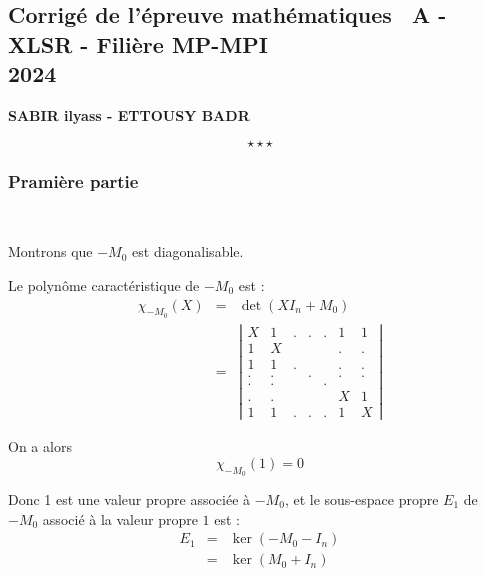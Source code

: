 \begin{center}
\subsection*{Corrig{\'e} de l'{\'e}preuve math{\'e}matiques \ A - \\ XLSR - Fili{\`e}re MP-MPI\\ 2024}\label{mathA_2023}
\textbf{SABIR ilyass - ETTOUSY BADR}
\end{center}
\[
\star \star \star
\]

\begin{center}
  \subsubsection*{Prami{\`e}re partie}
\end{center}

\

 Montrons que $- M_0$ est diagonalisable.

Le polyn{\^o}me caract{\'e}ristique de $- M_0$ est :
\begin{eqnarray*}
  \chi_{- M_0} (X) & = & \det (X I_n + M_0)\\
  & = & \left|\begin{array}{ccccccc}
    X & 1 & . & . & . & 1 & 1\\
    1 & X &  &  &  & . & .\\
    1 & 1 & . &  &  & . & .\\
    . & . &  & . &  & . & .\\
    . & . &  &  & . &  & \\
    . & . &  &  &  & X & 1\\
    1 & 1 & . & . & . & 1 & X
  \end{array}\right|
\end{eqnarray*}


On a alors
\[ \chi_{- M_0} (1) = 0 \]


Donc 1 est une valeur propre associ{\'e}e {\`a} $- M_0$, et le sous-espace
propre $E_1$ de $- M_0$ associ{\'e} {\`a} la valeur propre $1$ est :
\begin{eqnarray*}
  E_1 & = & \ker (- M_0 - I_n)\\
  & = & \ker (M_0 + I_n)
\end{eqnarray*}


